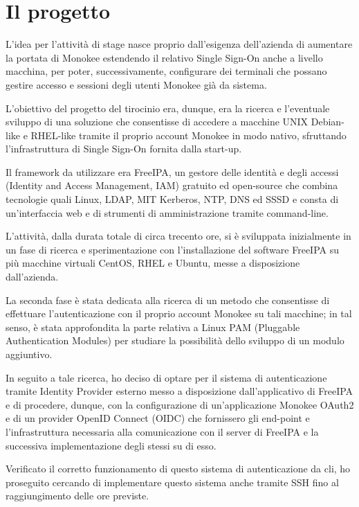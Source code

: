 \section{Il progetto}

L'idea per l'attività di stage nasce proprio dall'esigenza dell'azienda di aumentare la portata di Monokee estendendo il 
relativo Single Sign-On anche a livello macchina, per poter, successivamente, configurare dei terminali
che possano gestire accesso e sessioni degli utenti Monokee già da sistema.

L'obiettivo del progetto del tirocinio era, dunque, era la ricerca e l'eventuale sviluppo di una soluzione che consentisse
di accedere a macchine UNIX Debian-like e RHEL-like tramite il proprio account Monokee in modo nativo, sfruttando l'infrastruttura
di Single Sign-On fornita dalla start-up.

Il framework da utilizzare era FreeIPA, un gestore delle identità e degli accessi (Identity and Access Management, IAM)
gratuito ed open-source che combina tecnologie quali Linux, LDAP, MIT Kerberos, NTP, DNS ed SSSD e consta di un'interfaccia web
e di strumenti di amministrazione tramite command-line. 

L'attività, dalla durata totale di circa trecento ore, si è sviluppata inizialmente in un fase di ricerca e sperimentazione
con l'installazione del software FreeIPA su più macchine virtuali CentOS, RHEL e Ubuntu,
messe a disposizione dall'azienda.

La seconda fase è stata dedicata alla ricerca di un metodo che consentisse di effettuare l'autenticazione con il
proprio account Monokee su tali macchine; in tal senso, è stata approfondita la parte relativa a 
Linux PAM (Pluggable Authentication Modules) per studiare la possibilità dello sviluppo di un modulo aggiuntivo. 

In seguito a tale ricerca, ho deciso di optare per il sistema di autenticazione tramite Identity Provider esterno
messo a disposizione dall'applicativo di FreeIPA e di procedere, dunque, con la configurazione di un'applicazione
Monokee OAuth2 e di un provider OpenID Connect (OIDC) che fornissero gli end-point e l'infrastruttura 
necessaria alla comunicazione con il server di FreeIPA e la successiva implementazione degli stessi su di esso. 

Verificato il corretto funzionamento di questo sistema di autenticazione da \gls{cli},
ho proseguito cercando di implementare questo sistema anche tramite SSH fino al raggiungimento delle ore previste.


